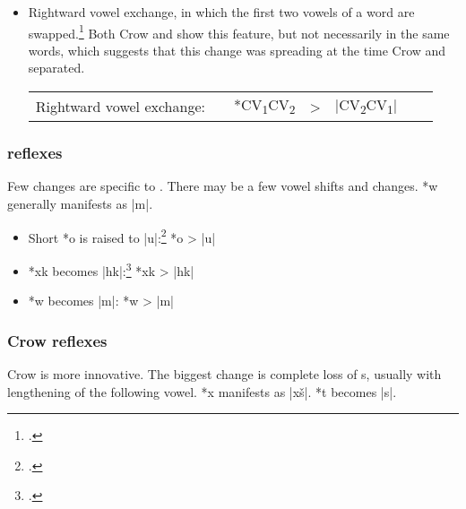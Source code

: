 \documentclass[output=paper]{LSP/langsci}
\begin{document}
\begin{itemize}
\item Rightward vowel exchange, in which the first two vowels of a word are swapped.\footnote{\citealt[193, 788]{Rankinetal2006PDF}.}  Both Crow and  show this feature, but not necessarily in the same words, which suggests that this change was spreading at the time Crow and  separated.



\begin{tabular}[t]{c c c c c c c}
Rightward vowel exchange:	 & & *CV\textsubscript{1}CV\textsubscript{2} & > & |CV\textsubscript{2}CV\textsubscript{1}|	
\end{tabular}
\end{itemize}

\subsubsection{ reflexes}

Few changes are specific to .  There may be a few vowel shifts and  changes.   *w generally manifests as |m|.

\begin{itemize}
\item Short *o is raised to |u|:\footnote{\citealt[137, 922]{Rankinetal2006PDF}.}	 \hspace{1em} *o	>	|u|
\item *xk becomes |hk|:\footnote{\citealt[193]{Rankinetal2006PDF}.} \hspace{3.2em}  *xk	>	|hk|
\item *w becomes |m|: \hspace{4.1em} *w	>	|m|
\end{itemize}

\subsubsection{Crow reflexes}

Crow is more innovative.  The biggest change is complete loss of s, usually with lengthening of the following vowel.   *x manifests as |xš|.   *t becomes |s|.
\end{document}
